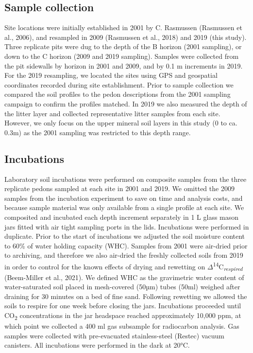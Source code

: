 \documentclass[english,man,floatsintext]{apa6}
\begin{document}
\hypertarget{sample-collection}{%
\subsection{Sample collection}\label{sample-collection}}

Site locations were initially established in 2001 by C. Rasmussen (Rasmussen et al., 2006), and resampled in 2009 (Rasmussen et al., 2018) and 2019 (this study). Three replicate pits were dug to the depth of the B horizon (2001 sampling), or down to the C horizon (2009 and 2019 sampling). Samples were collected from the pit sidewalls by horizon in 2001 and 2009, and by 0.1 m increments in 2019. For the 2019 resampling, we located the sites using GPS and geospatial coordinates recorded during site establishment. Prior to sample collection we compared the soil profiles to the pedon descriptions from the 2001 sampling campaign to confirm the profiles matched. In 2019 we also measured the depth of the litter layer and collected representative litter samples from each site. However, we only focus on the upper mineral soil layers in this study (0 to ca. 0.3m) as the 2001 sampling was restricted to this depth range.

\hypertarget{incubations}{%
\subsection{Incubations}\label{incubations}}

Laboratory soil incubations were performed on composite samples from the three replicate pedons sampled at each site in 2001 and 2019. We omitted the 2009 samples from the incubation experiment to save on time and analysis costs, and because sample material was only available from a single profile at each site. We composited and incubated each depth increment separately in 1 L glass mason jars fitted with air tight sampling ports in the lids. Incubations were performed in duplicate. Prior to the start of incubations we adjusted the soil moisture content to 60\% of water holding capacity (WHC). Samples from 2001 were air-dried prior to archiving, and therefore we also air-dried the freshly collected soils from 2019 in order to control for the known effects of drying and rewetting on \(\Delta\)\textsuperscript{14}C\textsubscript{\emph{respired}} (Beem-Miller et al., 2021). We defined WHC as the gravimetric water content of water-saturated soil placed in mesh-covered (50µm) tubes (50ml) weighed after draining for 30 minutes on a bed of fine sand. Following rewetting we allowed the soils to respire for one week before closing the jars. Incubations proceeded until CO\textsubscript{2} concentrations in the jar headspace reached approximately 10,000 ppm, at which point we collected a 400 ml gas subsample for radiocarbon analysis. Gas samples were collected with pre-evacuated stainless-steel (Restec) vacuum canisters. All incubations were performed in the dark at 20°C.
\end{document}
